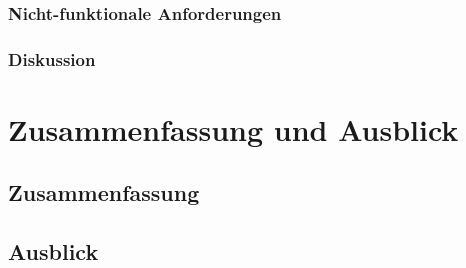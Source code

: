 \documentclass[11pt,a4paper]{scrartcl}
\begin{document}
\subsubsection{Nicht-funktionale Anforderungen}\label{subsubsec:non-functional-requirements}
\subsubsection{Diskussion}\label{subsubsec:anforderungsanalyse-discussion}

\section{Zusammenfassung und Ausblick}\label{sec:summary}
\subsection{Zusammenfassung}\label{subsec:summary}
\subsection{Ausblick}\label{subsec:outlook}

\newpage




\listoffigures
\end{document}
